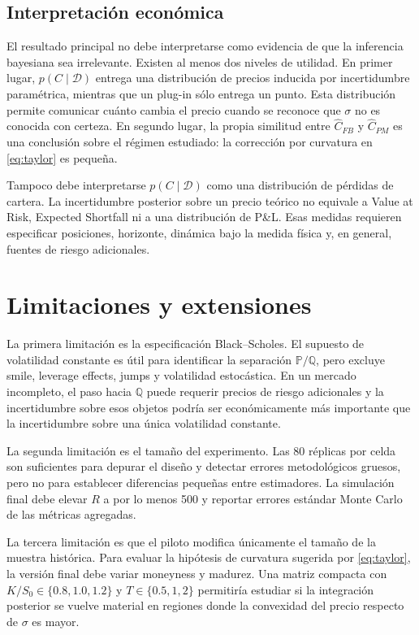 \documentclass[12pt,letterpaper]{article}
\newcommand{\Pmeasure}{\mathbb{P}}
\newcommand{\Qmeasure}{\mathbb{Q}}
\begin{document}
\subsection{Interpretación económica}

El resultado principal no debe interpretarse como evidencia de que la inferencia bayesiana sea irrelevante. Existen al menos dos niveles de utilidad. En primer lugar, $p(C\mid\mathcal D)$ entrega una distribución de precios inducida por incertidumbre paramétrica, mientras que un plug-in sólo entrega un punto. Esta distribución permite comunicar cuánto cambia el precio cuando se reconoce que $\sigma$ no es conocida con certeza. En segundo lugar, la propia similitud entre $\widehat C_{FB}$ y $\widehat C_{PM}$ es una conclusión sobre el régimen estudiado: la corrección por curvatura en \eqref{eq:taylor} es pequeña.

Tampoco debe interpretarse $p(C\mid\mathcal D)$ como una distribución de pérdidas de cartera. La incertidumbre posterior sobre un precio teórico no equivale a Value at Risk, Expected Shortfall ni a una distribución de P\&L. Esas medidas requieren especificar posiciones, horizonte, dinámica bajo la medida física y, en general, fuentes de riesgo adicionales.

\section{Limitaciones y extensiones}

La primera limitación es la especificación Black--Scholes. El supuesto de volatilidad constante es útil para identificar la separación $\Pmeasure/\Qmeasure$, pero excluye smile, leverage effects, jumps y volatilidad estocástica. En un mercado incompleto, el paso hacia $\Qmeasure$ puede requerir precios de riesgo adicionales y la incertidumbre sobre esos objetos podría ser económicamente más importante que la incertidumbre sobre una única volatilidad constante.

La segunda limitación es el tamaño del experimento. Las 80 réplicas por celda son suficientes para depurar el diseño y detectar errores metodológicos gruesos, pero no para establecer diferencias pequeñas entre estimadores. La simulación final debe elevar $R$ a por lo menos 500 y reportar errores estándar Monte Carlo de las métricas agregadas.

La tercera limitación es que el piloto modifica únicamente el tamaño de la muestra histórica. Para evaluar la hipótesis de curvatura sugerida por \eqref{eq:taylor}, la versión final debe variar moneyness y madurez. Una matriz compacta con $K/S_0\in\{0.8,1.0,1.2\}$ y $T\in\{0.5,1,2\}$ permitiría estudiar si la integración posterior se vuelve material en regiones donde la convexidad del precio respecto de $\sigma$ es mayor.
\end{document}
